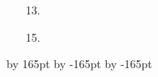 \documentclass{sebase}
\begin{document}
\begin{multicols}{2}
\begin{enumerate}
\item[\hfill 13.]

%

\item[\hfill 15.]

%

\end{enumerate}


\end{multicols}
\advance \leftskip by 165pt
\advance\hsize by -165pt
\advance\linewidth by -165pt%
\end{document}
